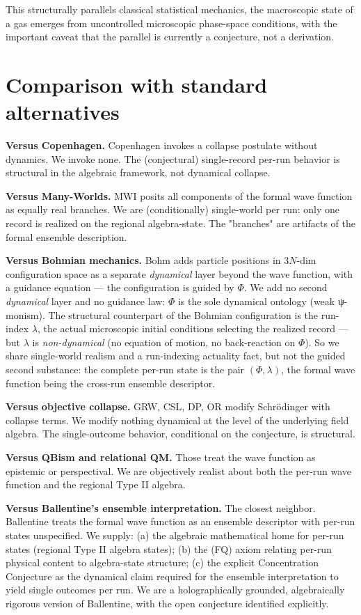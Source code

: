 \documentclass[11pt,a4paper]{article}
\begin{document}
This structurally parallels classical statistical mechanics, the macroscopic state of a gas emerges from uncontrolled microscopic phase-space conditions, with the important caveat that the parallel is currently a conjecture, not a derivation.

\section{Comparison with standard alternatives}

\textbf{Versus Copenhagen.} Copenhagen invokes a collapse postulate without dynamics. We invoke none. The (conjectural) single-record per-run behavior is structural in the algebraic framework, not dynamical collapse.

\textbf{Versus Many-Worlds.} MWI posits all components of the formal wave function as equally real branches. We are (conditionally) single-world per run: only one record is realized on the regional algebra-state. The "branches" are artifacts of the formal ensemble description.

\textbf{Versus Bohmian mechanics.} Bohm adds particle positions in $3N$-dim configuration space as a separate \emph{dynamical} layer beyond the wave function, with a guidance equation — the configuration is guided by $\Phi$. We add no second \emph{dynamical} layer and no guidance law: $\Phi$ is the sole dynamical ontology (weak ψ-monism). The structural counterpart of the Bohmian configuration is the run-index $\lambda$, the actual microscopic initial conditions selecting the realized record — but $\lambda$ is \emph{non-dynamical} (no equation of motion, no back-reaction on $\Phi$). So we share single-world realism and a run-indexing actuality fact, but not the guided second substance: the complete per-run state is the pair $(\Phi, \lambda)$, the formal wave function being the cross-run ensemble descriptor.

\textbf{Versus objective collapse.} GRW, CSL, DP, OR modify Schrödinger with collapse terms. We modify nothing dynamical at the level of the underlying field algebra. The single-outcome behavior, conditional on the conjecture, is structural.

\textbf{Versus QBism and relational QM.} Those treat the wave function as epistemic or perspectival. We are objectively realist about both the per-run wave function and the regional Type II algebra.

\textbf{Versus Ballentine's ensemble interpretation.} The closest neighbor. Ballentine treats the formal wave function as an ensemble descriptor with per-run states unspecified. We supply: (a) the algebraic mathematical home for per-run states (regional Type II algebra states); (b) the (FQ) axiom relating per-run physical content to algebra-state structure; (c) the explicit Concentration Conjecture as the dynamical claim required for the ensemble interpretation to yield single outcomes per run. We are a holographically grounded, algebraically rigorous version of Ballentine, with the open conjecture identified explicitly.
\end{document}
